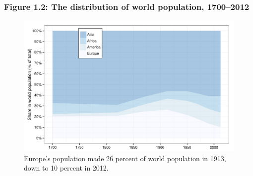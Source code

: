 \documentclass[t]{beamer}\usepackage[]{graphicx}\usepackage[]{color}
\newenvironment{knitrout}{}{} %
\begin{document}
\begin{frame}[label=Figure_1_2b]
\frametitle{Figure 1.2: The distribution of world population, 1700--2012}
\begin{figure}[t]
\begin{minipage}[b]{\textwidth}
\centering
\begin{knitrout}\footnotesize
{}\color{fgcolor}

{\centering \includegraphics[width=1\linewidth]{figures/color/Figure_1_2b} 

}



\end{knitrout}
\caption{Europe's population made 26 percent of world population in 1913, down to 10 percent in 2012.}
\end{minipage}
\end{figure}
\end{frame}
\end{document}
